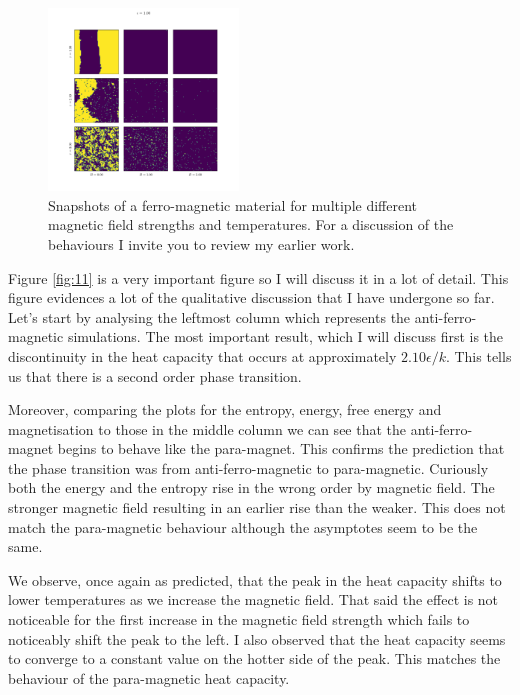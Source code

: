 \documentclass[a4paper, twocolumn]{article}
\begin{document}
\begin{figure}[h]
    \centering
    \includegraphics[width=0.45\textwidth]{pub/figures/external_field_epsilon_one.pdf}
    \caption{Snapshots of a ferro-magnetic material for multiple %
        different magnetic field strengths and temperatures. For a %
        discussion of the behaviours I invite you to review my earlier %
        work.}
    \label{fig:10}
\end{figure}


Figure \ref{fig:11} is a very important figure so I will discuss it in %
a lot of detail. This figure evidences a lot of the qualitative discussion %
that I have undergone so far. Let's start by analysing the leftmost %
column which represents the anti-ferro-magnetic simulations. The most %
important result, which I will discuss first is the discontinuity in the %
heat capacity that occurs at approximately \(2.10 \epsilon / k\). This %
tells us that there is a second order phase transition. 


Moreover, comparing the plots for the entropy, energy, free energy and %
magnetisation to those in the middle column we can see that the %
anti-ferro-magnet begins to behave like the para-magnet. This confirms %
the prediction that the phase transition was from anti-ferro-magnetic %
to para-magnetic. Curiously both the energy and the entropy rise %
in the wrong order by magnetic field. The stronger magnetic field %
resulting in an earlier rise than the weaker. This does not match %
the para-magnetic behaviour although the asymptotes seem to be the same. 


We observe, once again as predicted, that the peak in the heat capacity %
shifts to lower temperatures as we increase the magnetic field. That said %
the effect is not noticeable for the first increase in the magnetic field %
strength which fails to noticeably shift the peak to the left. I also %
observed that the heat capacity seems to converge to a constant value %
on the hotter side of the peak. This matches the behaviour of the %
para-magnetic heat capacity. 
\end{document}
